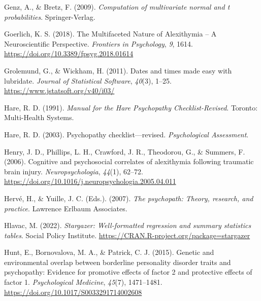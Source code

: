 \documentclass[
  man,floatsintext]{apa7}
\newlength{\cslhangindent}
\newlength{\cslentryspacingunit} %
\newenvironment{CSLReferences}[2] %
 {%
  \setlength{\parindent}{0pt}
  \ifodd #1
  \let\oldpar\par
  \def\par{\hangindent=\cslhangindent\oldpar}
  \fi
  \setlength{\parskip}{#2\cslentryspacingunit}
 }%
 {}
\begin{document}
\begin{CSLReferences}{1}{0}
\leavevmode{}%
Genz, A., \& Bretz, F. (2009). \emph{Computation of multivariate normal and t probabilities}. Springer-Verlag.

\leavevmode{}%
Goerlich, K. S. (2018). The {Multifaceted Nature} of {Alexithymia} -- {A Neuroscientific Perspective}. \emph{Frontiers in Psychology}, \emph{9}, 1614. \url{https://doi.org/10.3389/fpsyg.2018.01614}

\leavevmode{}%
Grolemund, G., \& Wickham, H. (2011). Dates and times made easy with {lubridate}. \emph{Journal of Statistical Software}, \emph{40}(3), 1--25. \url{https://www.jstatsoft.org/v40/i03/}

\leavevmode{}%
Hare, R. D. (1991). \emph{Manual for the {Hare Psychopathy Checklist-Revised}}. {Toronto: Multi-Health Systems}.

\leavevmode{}%
Hare, R. D. (2003). Psychopathy checklist---revised. \emph{Psychological Assessment}.

\leavevmode{}%
Henry, J. D., Phillips, L. H., Crawford, J. R., Theodorou, G., \& Summers, F. (2006). Cognitive and psychosocial correlates of alexithymia following traumatic brain injury. \emph{Neuropsychologia}, \emph{44}(1), 62--72. \url{https://doi.org/10.1016/j.neuropsychologia.2005.04.011}

\leavevmode{}%
Hervé, H., \& Yuille, J. C. (Eds.). (2007). \emph{The psychopath: Theory, research, and practice}. {Lawrence Erlbaum Associates}.

\leavevmode{}%
Hlavac, M. (2022). \emph{Stargazer: Well-formatted regression and summary statistics tables}. Social Policy Institute. \url{https://CRAN.R-project.org/package=stargazer}

\leavevmode{}%
Hunt, E., Bornovalova, M. A., \& Patrick, C. J. (2015). Genetic and environmental overlap between borderline personality disorder traits and psychopathy: Evidence for promotive effects of factor 2 and protective effects of factor 1. \emph{Psychological Medicine}, \emph{45}(7), 1471--1481. \url{https://doi.org/10.1017/S0033291714002608}


\end{CSLReferences}
\end{document}
